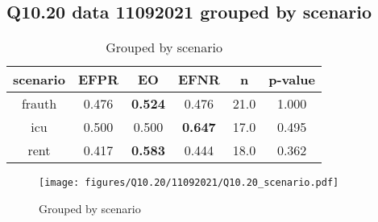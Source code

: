\subsection{Q10.20 data 11092021 grouped by scenario}

\begin{comment}
            EFPR        EO      EFNR     n    pvalue
frauth  0.476190  0.523810  0.476190  21.0  1.000000
icu     0.500000  0.500000  0.647059  17.0  0.494974
rent    0.416667  0.583333  0.444444  18.0  0.361935
\end{comment}

\begin{table}[h]
    \centering
    \begin{tabular}{|c|c|c|c|c|c|}
        \hline
        scenario & EFPR & EO & EFNR & n & p-value\\
        \hline
        frauth & 0.476 & \textbf{0.524} & 0.476 & 21.0 & 1.000\\
		icu & 0.500 & 0.500 & \textbf{0.647} & 17.0 & 0.495\\
		rent & 0.417 & \textbf{0.583} & 0.444 & 18.0 & 0.362\\
		
        \hline
    \end{tabular}
    \caption{Grouped by scenario}
    \label{tab:my_label}
\end{table}
\begin{figure}[h]
    \centering
    \texttt{[image: figures/Q10.20/11092021/Q10.20\_scenario.pdf]}
    \caption{Grouped by scenario}
    \label{fig:my_label}
\end{figure}
